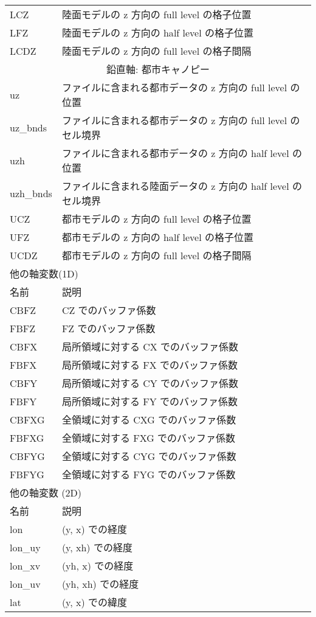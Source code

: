 \begin{longtable}{l|l}
LCZ  & 陸面モデルの z 方向の full level の格子位置 \\
LFZ  & 陸面モデルの z 方向の half level の格子位置 \\
LCDZ & 陸面モデルの z 方向の full level の格子間隔 \\  \hline
\multicolumn{2}{c}{鉛直軸: 都市キャノピー}\\ \hline
uz        & ファイルに含まれる都市データの z 方向の full level の位置 \\
uz\_bnds  & ファイルに含まれる都市データの z 方向の full level のセル境界 \\
uzh       & ファイルに含まれる都市データの z 方向の half level の位置 \\
uzh\_bnds & ファイルに含まれる陸面データの z 方向の half level のセル境界 \\
UCZ  & 都市モデルの z 方向の full level の格子位置 \\
UFZ  & 都市モデルの z 方向の half level の格子位置 \\
UCDZ & 都市モデルの z 方向の full level の格子間隔 \\ \hline
 \hline
  \multicolumn{2}{l}{他の軸変数(1D)}\\ \hline
名前  & 説明 \\ \hline \hline
CBFZ  & CZ でのバッファ係数 \\
FBFZ  & FZ でのバッファ係数 \\
CBFX  & 局所領域に対する CX でのバッファ係数 \\
FBFX  & 局所領域に対する FX でのバッファ係数 \\
CBFY  & 局所領域に対する CY でのバッファ係数 \\
FBFY  & 局所領域に対する FY でのバッファ係数 \\
CBFXG & 全領域に対する CXG でのバッファ係数 \\
FBFXG & 全領域に対する FXG でのバッファ係数 \\
CBFYG & 全領域に対する CYG でのバッファ係数 \\
FBFYG & 全領域に対する FYG でのバッファ係数 \\
\hline
\multicolumn{2}{l}{他の軸変数 (2D)}\\ \hline
名前 & 説明 \\ \hline \hline
lon     & (y, x) での経度 \\
lon\_uy & (y, xh) での経度 \\
lon\_xv & (yh, x) での経度 \\
lon\_uv & (yh, xh) での経度 \\
lat     & (y, x) での緯度  \\

\end{longtable}
